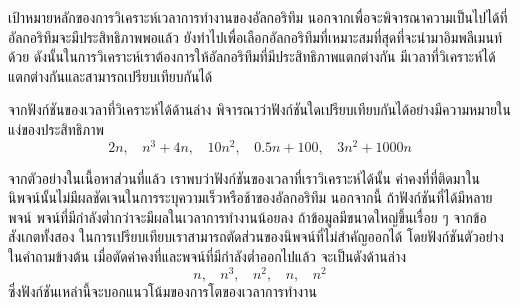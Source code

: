 เป้าหมาย{\wbr}หลัก{\wbr}ของ{\wbr}การ{\wbr}วิเคราะห์{\wbr}เวลา{\wbr}การ{\wbr}ทำงาน{\wbr}ของ{\wbr}อัล{\wbr}กอ{\wbr}ริ{\wbr}ทึม{\wbr}
นอกจาก{\wbr}เพื่อ{\wbr}จะ{\wbr}พิจารณา{\wbr}ความ{\wbr}เป็น{\wbr}ไป{\wbr}ได้{\wbr}ที่{\wbr}อัล{\wbr}กอ{\wbr}ริ{\wbr}ทึม{\wbr}จะ{\wbr}มี{\wbr}ประสิทธิภาพ{\wbr}พอ{\wbr}แล้ว{\wbr}
ยัง{\wbr}ทำ{\wbr}ไป{\wbr}เพื่อ{\wbr}เลือก{\wbr}อัล{\wbr}กอ{\wbr}ริ{\wbr}ทึม{\wbr}ที่{\wbr}เหมาะสม{\wbr}ที่สุด{\wbr}ที่{\wbr}จะ{\wbr}นำมา{\wbr}อิม{\wbr}พลี{\wbr}เมนท์{\wbr}ด้วย{\wbr}
ดังนั้น{\wbr}ใน{\wbr}การ{\wbr}วิเคราะห์{\wbr}เรา{\wbr}ต้องการ{\wbr}ให้{\wbr}อัล{\wbr}กอ{\wbr}ริ{\wbr}ทึม{\wbr}ที่{\wbr}มี{\wbr}ประสิทธิภาพ{\wbr}แตกต่าง{\wbr}กัน{\wbr}
มี{\wbr}เวลา{\wbr}ที่{\wbr}วิเคราะห์{\wbr}ได้{\wbr}แตกต่าง{\wbr}กัน{\wbr}และ{\wbr}สามารถ{\wbr}เปรียบเทียบ{\wbr}กัน{\wbr}ได้{\wbr}

\begin{quiz}{}
จาก{\wbr}ฟังก์ชัน{\wbr}ของ{\wbr}เวลา{\wbr}ที่{\wbr}วิเคราะห์{\wbr}ได้{\wbr}ด้าน{\wbr}ล่าง{\wbr}
พิจารณา{\wbr}ว่า{\wbr}ฟังก์ชัน{\wbr}ใด{\wbr}เปรียบเทียบ{\wbr}กัน{\wbr}ได้{\wbr}อย่าง{\wbr}มี{\wbr}ความหมาย{\wbr}ใน{\wbr}แง่{\wbr}ของ{\wbr}ประสิทธิภาพ{\wbr}
\[
2n, \ \ \ \ n^3 + 4n, \ \ \ \ 10n^2, \ \ \ \ 0.5n + 100, \ \ \ \ 3n^2 + 1000n
\]
\end{quiz}

จาก{\wbr}ตัวอย่าง{\wbr}ใน{\wbr}เนื้อหา{\wbr}ส่วน{\wbr}ที่แล้ว เรา{\wbr}พบ{\wbr}ว่า{\wbr}ฟังก์ชัน{\wbr}ของ{\wbr}เวลา{\wbr}ที่{\wbr}เรา{\wbr}วิเคราะห์{\wbr}ได้{\wbr}นั้น{\wbr}
ค่าคงที่{\wbr}ที่{\wbr}ติด{\wbr}มา{\wbr}ใน{\wbr}นิพจน์{\wbr}นั้น{\wbr}ไม่{\wbr}มี{\wbr}ผล{\wbr}ชัดเจน{\wbr}ใน{\wbr}การ{\wbr}ระบุ{\wbr}ความ{\wbr}เร็ว{\wbr}หรือ{\wbr}ช้า{\wbr}ของ{\wbr}อัล{\wbr}กอ{\wbr}ริ{\wbr}ทึม นอกจากนี้{\wbr}
ถ้า{\wbr}ฟังก์ชัน{\wbr}ที่{\wbr}ได้{\wbr}มี{\wbr}หลาย{\wbr}พจน์ พจน์{\wbr}ที่{\wbr}มี{\wbr}กำลัง{\wbr}ต่ำ{\wbr}กว่า{\wbr}จะ{\wbr}มี{\wbr}ผล{\wbr}ใน{\wbr}เวลา{\wbr}การ{\wbr}ทำงาน{\wbr}น้อย{\wbr}ลง{\wbr}
ถ้า{\wbr}ข้อมูล{\wbr}มี{\wbr}ขนาด{\wbr}ใหญ่{\wbr}ขึ้น{\wbr}เรื่อย ๆ จาก{\wbr}ข้อสังเกต{\wbr}ทั้ง{\wbr}สอง{\wbr}
ใน{\wbr}การ{\wbr}เปรียบเทียบ{\wbr}เรา{\wbr}สามารถ{\wbr}ตัด{\wbr}ส่วน{\wbr}ของ{\wbr}นิพจน์{\wbr}ที่{\wbr}ไม่{\wbr}สำคัญ{\wbr}ออก{\wbr}ได้{\wbr}
โดย{\wbr}ฟังก์ชัน{\wbr}ตัวอย่าง{\wbr}ใน{\wbr}คำถาม{\wbr}ข้างต้น เมื่อ{\wbr}ตัด{\wbr}ค่าคงที่{\wbr}และ{\wbr}พจน์{\wbr}ที่{\wbr}มี{\wbr}กำลัง{\wbr}ต่ำ{\wbr}ออก{\wbr}ไป{\wbr}แล้ว{\wbr}
จะ{\wbr}เป็น{\wbr}ดัง{\wbr}ด้าน{\wbr}ล่าง{\wbr}
\[
n, \ \ \ \ n^3, \ \ \ \ n^2, \ \ \ \ n, \ \ \ \ n^2
\]
ซึ่ง{\wbr}ฟังก์ชัน{\wbr}เหล่านี้{\wbr}จะ{\wbr}บอก{\wbr}แนวโน้ม{\wbr}ของ{\wbr}การ{\wbr}โต{\wbr}ของ{\wbr}เวลา{\wbr}การ{\wbr}ทำงาน{\wbr}

